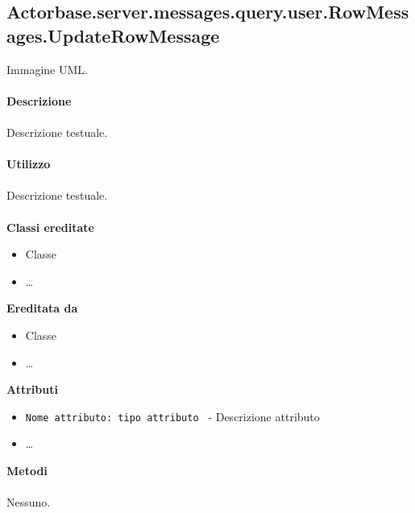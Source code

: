 \documentclass[a4paper]{article}
\begin{document}
	\subsection{Actorbase.server.messages.query.user.RowMessages.UpdateRowMessage}
		Immagine UML.
		\\ \\
		\textbf{Descrizione}
			\\ \\
			Descrizione testuale.
			\\ \\
		\textbf{Utilizzo}
			\\ \\
			Descrizione testuale.
			\\ \\
		\textbf{Classi ereditate}
			\begin{itemize}
				\item Classe
				\item \dots
			\end{itemize}
		\textbf{Ereditata da}
			\begin{itemize}
				\item Classe
				\item \dots
			\end{itemize}
		\textbf{Attributi}
			\begin{itemize}
				\item \texttt{Nome attributo: tipo attributo } - Descrizione attributo
				\item \dots
			\end{itemize}
		\textbf{Metodi}
			\\ \\
			Nessuno.		
			
\end{document}
